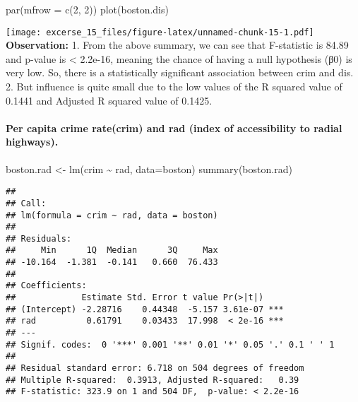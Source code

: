 \documentclass[
]{article}
\newenvironment{Shaded}{\begin{snugshade}}{\end{snugshade}}
\newcommand{\AttributeTok}[1]{\textcolor[rgb]{0.77,0.63,0.00}{#1}}
\newcommand{\DecValTok}[1]{\textcolor[rgb]{0.00,0.00,0.81}{#1}}
\newcommand{\FunctionTok}[1]{\textcolor[rgb]{0.00,0.00,0.00}{#1}}
\newcommand{\NormalTok}[1]{#1}
\newcommand{\OtherTok}[1]{\textcolor[rgb]{0.56,0.35,0.01}{#1}}
\newcommand{\SpecialCharTok}[1]{\textcolor[rgb]{0.00,0.00,0.00}{#1}}
\begin{document}
\begin{Shaded}
\begin{Highlighting}[]
\FunctionTok{par}\NormalTok{(}\AttributeTok{mfrow =} \FunctionTok{c}\NormalTok{(}\DecValTok{2}\NormalTok{, }\DecValTok{2}\NormalTok{))}
\FunctionTok{plot}\NormalTok{(boston.dis)}
\end{Highlighting}
\end{Shaded}

\texttt{[image: excerse\_15\_files/figure-latex/unnamed-chunk-15-1.pdf]}
\textbf{Observation:} 1. From the above summary, we can see that
F-statistic is 84.89 and p-value is \textless{} 2.2e-16, meaning the
chance of having a null hypothesis (β0) is very low. So, there is a
statistically significant association between crim and dis. 2. But
influence is quite small due to the low values of the R squared value of
0.1441 and Adjusted R squared value of 0.1425.

\hypertarget{per-capita-crime-ratecrim-and-rad-index-of-accessibility-to-radial-highways.}{%
\paragraph{Per capita crime rate(crim) and rad (index of accessibility
to radial
highways).}\label{per-capita-crime-ratecrim-and-rad-index-of-accessibility-to-radial-highways.}}

\begin{Shaded}
\begin{Highlighting}[]
\NormalTok{boston.rad }\OtherTok{\textless{}{-}} \FunctionTok{lm}\NormalTok{(crim }\SpecialCharTok{\textasciitilde{}}\NormalTok{ rad, }\AttributeTok{data=}\NormalTok{boston)}
\FunctionTok{summary}\NormalTok{(boston.rad)}
\end{Highlighting}
\end{Shaded}

\begin{verbatim}
## 
## Call:
## lm(formula = crim ~ rad, data = boston)
## 
## Residuals:
##     Min      1Q  Median      3Q     Max 
## -10.164  -1.381  -0.141   0.660  76.433 
## 
## Coefficients:
##             Estimate Std. Error t value Pr(>|t|)    
## (Intercept) -2.28716    0.44348  -5.157 3.61e-07 ***
## rad          0.61791    0.03433  17.998  < 2e-16 ***
## ---
## Signif. codes:  0 '***' 0.001 '**' 0.01 '*' 0.05 '.' 0.1 ' ' 1
## 
## Residual standard error: 6.718 on 504 degrees of freedom
## Multiple R-squared:  0.3913, Adjusted R-squared:   0.39 
## F-statistic: 323.9 on 1 and 504 DF,  p-value: < 2.2e-16
\end{verbatim}
\end{document}
